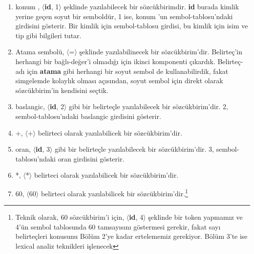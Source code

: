 \begin{enumerate}

  \item {\selectfont konum }, $\langle$\textbf{id}, 1$\rangle$ şeklinde yazılabilecek bir sözcükbirimdir. \textbf{id} burada kimlik yerine geçen soyut bir semboldür, 1 ise, {\selectfont konum }'un sembol-tablosu'ndaki girdisini gösterir. Bir kimlik için sembol-tablosu girdisi, bu kimlik için isim ve tip gibi bilgileri tutar.
  
  \item Atama sembolü, $\langle$=$\rangle$ şeklinde yazılabilinecek bir sözcükbirim'dir. Belirteç'in herhangi bir bağlı-değer'i olmadığı için ikinci komponenti çıkardık. Belirteç-adı için \textbf{atama} gibi herhangi bir soyut sembol de kullanabilirdik, fakat simgelemde kolaylık olması açısından, soyut sembol için direkt olarak sözcükbirim'in kendisini seçtik.
  
   \item {\selectfont baslangic}, $\langle$\textbf{id}, 2$\rangle$ gibi bir belirteçle yazılabilecek bir sözcükbirim'dir. 2, sembol-tablosu'ndaki {\selectfont baslangic} girdisini gösterir.
   
   \item +, $\langle$+$\rangle$ belirteci olarak yazılabilicek bir sözcükbirim'dir.
   
   \item {\selectfont oran}, $\langle$\textbf{id}, 3$\rangle$ gibi bir belirteçle yazılabilecek bir sözcükbirim'dir. 3, sembol-tablosu'ndaki {\selectfont oran} girdisini gösterir.
   
   \item *, $\langle$*$\rangle$ belirteci olarak yazılabilicek bir sözcükbirim'dir.
   
   \renewcommand{\thefootnote}{\arabic{footnote}}
   \setcounter{footnote}{0}
   
   \item 60, $\langle$60$\rangle$ belirteci olarak yazılabilicek bir sözcükbirim'dir.\footnote{Teknik olarak, 60 sözcükbirim'i için, $\langle$\textbf{id}, 4$\rangle$ şeklinde bir token yapmamız ve 4'ün sembol tablosunda 60 tamsayısını göstermesi gerekir, fakat sayı belirteçleri konusunu Bölüm 2'ye kadar ertelememiz gerekiyor. Bölüm 3'te ise lexical analiz teknikleri işlenecek} 
   
   \renewcommand{\thefootnote}{\fnsymbol{footnote}}
    
\end{enumerate} 

